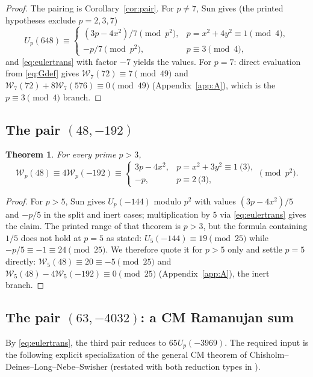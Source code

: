 \documentclass[11pt]{amsart}
\newtheorem{theorem}{Theorem}[section]
\theoremstyle{definition}
\theoremstyle{remark}
\begin{document}
\begin{proof}
The pairing is Corollary~\ref{cor:pair}. For $p\ne7$, Sun
\cite[Theorem~2.10]{SunBQF} gives (the printed hypotheses exclude
$p=2,3,7$)
\[
U_p(648)\equiv
\begin{cases}
(3p-4x^2)/7\pmod{p^2},&p=x^2+4y^2\equiv1\pmod4,\\
-p/7\pmod{p^2},&p\equiv3\pmod4,
\end{cases}
\]
and \eqref{eq:eulertrans} with factor $-7$ yields the values. For
$p=7$: direct evaluation from \eqref{eq:Gdef} gives
$\mathcal W_7(72)\equiv7\pmod{49}$ and
$\mathcal W_7(72)+8\mathcal W_7(576)\equiv0\pmod{49}$
(Appendix~\ref{app:A}), which is the $p\equiv3\pmod4$ branch.
\end{proof}

\subsection{The pair \texorpdfstring{$(48,-192)$}{(48,-192)}}

\begin{theorem}\label{thm:grpB}
For every prime $p>3$,
\[
\mathcal W_p(48)\equiv4\mathcal W_p(-192)\equiv
\begin{cases}
3p-4x^2,&p=x^2+3y^2\equiv1\pod3,\\
-p,&p\equiv2\pod3,
\end{cases}
\pmod{p^2}.
\]
\end{theorem}

\begin{proof}
For $p>5$, Sun \cite[Theorem~2.9]{SunBQF} gives $U_p(-144)$ modulo
$p^2$ with values $(3p-4x^2)/5$ and $-p/5$ in the split and inert cases;
multiplication by $5$ via \eqref{eq:eulertrans} gives the claim.
The printed range of that theorem is $p>3$, but the formula containing
$1/5$ does not hold at $p=5$ as stated: $U_5(-144)\equiv19\pmod{25}$
while $-p/5\equiv-1\equiv24\pmod{25}$. We therefore quote it for $p>5$
only and settle $p=5$ directly: $\mathcal W_5(48)\equiv20\equiv-5
\pmod{25}$ and $\mathcal W_5(48)-4\mathcal W_5(-192)\equiv0\pmod{25}$
(Appendix~\ref{app:A}), the inert branch.
\end{proof}

\subsection{The pair \texorpdfstring{$(63,-4032)$}{(63,-4032)}: a CM Ramanujan sum}

By \eqref{eq:eulertrans}, the third pair reduces to $65U_p(-3969)$.
The required input is the following explicit specialization of the
general CM theorem of Chisholm--Deines--Long--Nebe--Swisher
\cite[Theorem~1]{CDLNS} (restated with both reduction types in
\cite[Theorem~2.1]{BRSTT}).
\end{document}
